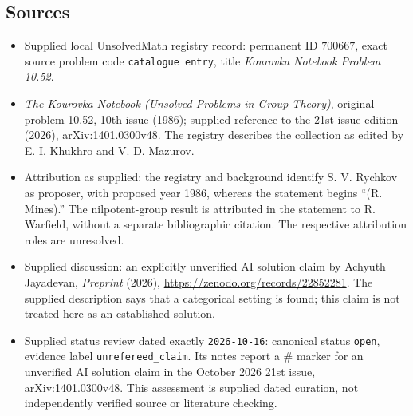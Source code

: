 \documentclass[11pt]{article}
\begin{document}
\subsection{Sources}
\begin{itemize}
\item Supplied local UnsolvedMath registry record: permanent ID \(700667\), exact source problem code \texttt{catalogue entry}, title \emph{Kourovka Notebook Problem 10.52}.
\item \emph{The Kourovka Notebook (Unsolved Problems in Group Theory)}, original problem 10.52, 10th issue (1986); supplied reference to the 21st issue edition (2026), arXiv:1401.0300v48. The registry describes the collection as edited by E. I. Khukhro and V. D. Mazurov.
\item Attribution as supplied: the registry and background identify S. V. Rychkov as proposer, with proposed year 1986, whereas the statement begins ``(R. Mines).'' The nilpotent-group result is attributed in the statement to R. Warfield, without a separate bibliographic citation. The respective attribution roles are unresolved.
\item Supplied discussion: an explicitly unverified AI solution claim by Achyuth Jayadevan, \emph{Preprint} (2026), \url{https://zenodo.org/records/22852281}. The supplied description says that a categorical setting is found; this claim is not treated here as an established solution.
\item Supplied status review dated exactly \texttt{2026-10-16}: canonical status \texttt{open}, evidence label \texttt{unrefereed\_claim}. Its notes report a \(\#\) marker for an unverified AI solution claim in the October 2026 21st issue, arXiv:1401.0300v48. This assessment is supplied dated curation, not independently verified source or literature checking.
\end{itemize}
\end{document}
